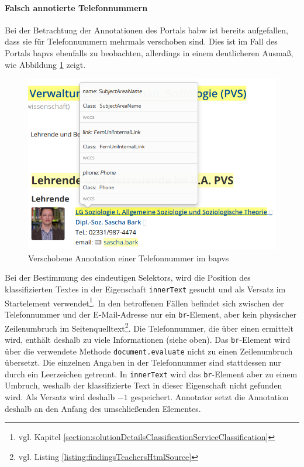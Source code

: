     \paragraph{Falsch annotierte Telefonnummern}
    Bei der Betrachtung der Annotationen des Portals \gls{babw}
    ist bereits aufgefallen, dass sie für Telefonnummern
    mehrmals verschoben sind.
    Dies ist im Fall des Portals \gls{bapvs} ebenfalls zu beobachten,
    allerdings in einem deutlicheren Ausmaß,
    wie Abbildung \ref{image:findingTeachersBaPVSWrongPhone} zeigt.

    \begin{figure}[htb]
        \centering
        \includegraphics[scale=\screenshotScaleFactor]{../resources/findings/case-study-1/bapvs/annotations/triple-annotation.png}
        \caption{Verschobene Annotation einer Telefonnummer im \acrshort{bapvs}}
        \label{image:findingTeachersBaPVSWrongPhone}
    \end{figure}

    Bei der Bestimmung des eindeutigen Selektors,
    wird die Position des klassifizierten Textes in der Eigenschaft
    \texttt{innerText} gesucht und als Versatz im Startelement
    verwendet\footnote{vgl. Kapitel \ref{section:solutionDetailsClassificationServiceClassification}}.
    In den betroffenen Fällen befindet sich zwischen der Telefonnummer
    und der E-Mail-Adresse nur ein \texttt{br}-Element,
    aber kein physischer Zeilenumbruch im
    Seitenquelltext\footnote{vgl. Listing \ref{listing:findingsTeachersHtmlSource}}.
    Die Telefonnummer, die über einen {\xpathSelector} ermittelt wird,
    enthält deshalb zu viele Informationen (siehe oben).
    Das \texttt{br}-Element wird über die verwendete Methode \texttt{document.evaluate} nicht zu einen Zeilenumbruch übersetzt.
    Die einzelnen Angaben in der Telefonnummer sind stattdessen nur durch ein Leerzeichen getrennt.
    In \texttt{innerText} wird das \texttt{br}-Element aber zu einem Umbruch,
    weshalb der klassifizierte Text in dieser Eigenschaft nicht gefunden wird.
    Als Versatz wird deshalb $-1$ gespeichert.
    Annotator setzt die Annotation deshalb an den Anfang des umschließenden Elementes.
